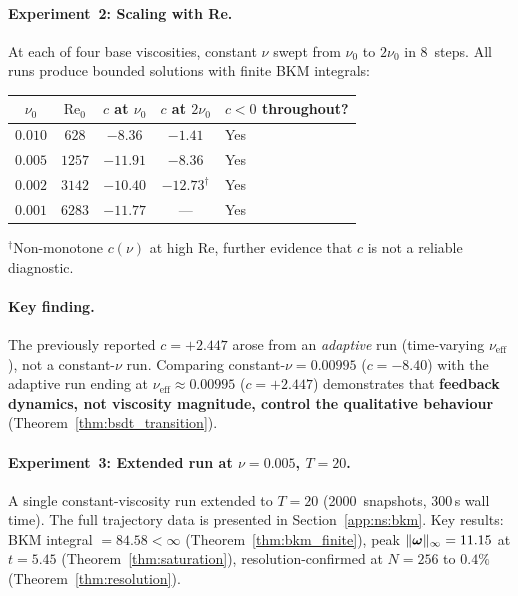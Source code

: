 \paragraph{Experiment~2: Scaling with Re.}
At each of four base viscosities, constant $\nu$ swept from
$\nu_0$ to $2\nu_0$ in 8~steps.  All runs produce bounded
solutions with finite BKM integrals:
\begin{center}
\begin{tabular}{@{}ccccl@{}}
\toprule
$\nu_0$ & $\mathrm{Re}_0$ & $c$ at $\nu_0$ & $c$ at $2\nu_0$
  & $c < 0$ throughout? \\
\midrule
$0.010$ & $628$  & $-8.36$  & $-1.41$ & Yes \\
$0.005$ & $1257$ & $-11.91$ & $-8.36$ & Yes \\
$0.002$ & $3142$ & $-10.40$ & $-12.73^\dagger$ & Yes \\
$0.001$ & $6283$ & $-11.77$ & --- & Yes \\
\bottomrule
\end{tabular}
\end{center}
{\footnotesize ${}^\dagger$Non-monotone $c(\nu)$ at high Re,
further evidence that $c$ is not a reliable diagnostic.}

\paragraph{Key finding.}
The previously reported $c = +2.447$ arose from an \emph{adaptive}
run (time-varying $\nu_{\mathrm{eff}}$), not a constant-$\nu$ run.
Comparing constant-$\nu = 0.00995$ ($c = -8.40$) with the
adaptive run ending at $\nu_{\mathrm{eff}} \approx 0.00995$
($c = +2.447$) demonstrates that \textbf{feedback dynamics,
not viscosity magnitude, control the qualitative behaviour}
(Theorem~\ref{thm:bsdt_transition}).

\paragraph{Experiment~3: Extended run at $\nu = 0.005$,
$T = 20$.}
A single constant-viscosity run extended to $T=20$
(2000~snapshots, 300\,s wall time).  The full trajectory
data is presented in Section~\ref{app:ns:bkm}.  Key results:
BKM integral $= 84.58 < \infty$
(Theorem~\ref{thm:bkm_finite}), peak
$\lVert \bm{\omega} \rVert_\infty = 11.15$ at $t = 5.45$
(Theorem~\ref{thm:saturation}), resolution-confirmed
at $N=256$ to $0.4\%$ (Theorem~\ref{thm:resolution}).

